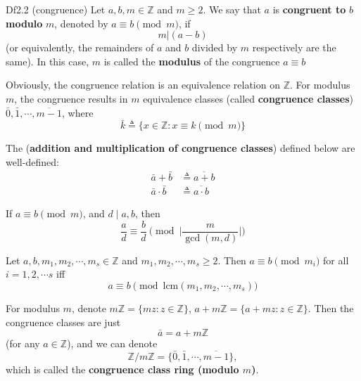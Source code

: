 \documentclass{article}
\newcommand{\lcm}{\text{lcm}}
\begin{document}
\begin{Df}{Df2.2 (congruence)}
    Let $a, b, m\in\mathbb{Z}$ and $m\geq 2$. We say that $a$ is \textbf{congruent to} $b$ \textbf{modulo} $m$, denoted by $a\equiv b\pmod{m}$, if
    $$ m|(a-b) $$
    (or equivalently, the remainders of $a$ and $b$ divided by $m$ respectively are the same). In this case, $m$ is called the \textbf{modulus} of the congruence $a\equiv b$
\end{Df}

\begin{Rmk}{}
    \begin{compactenum}
        \item \textcolor{Th}{Obviously, the congruence relation is an equivalence relation on $\mathbb{Z}$. For modulus $m$, the congruence results in $m$ equivalence classes} \textcolor{Df}{(called \textbf{congruence classes})} \textcolor{Th}{$\bar{0}, \bar{1}, \cdots, \overline{m-1}$, where}
        \textcolor{Df}{$$ \bar{k} \triangleq \{x\in\mathbb{Z}: x\equiv k\pmod{m}\} $$}
        \item \textcolor{Th}{The} \textcolor{Df}{(\textbf{addition and multiplication of congruence classes})} defined below are well-defined:
        \textcolor{Th}{$$ \begin{aligned}
            \bar{a} + \bar{b} &\triangleq \overline{a+b} \\
            \bar{a}\cdot \bar{b} &\triangleq \overline{a\cdot b}
        \end{aligned} $$}
        \item If $a\equiv b\pmod{m}$, and $d\mid a, b$, then
        $$ \frac{a}{d} \equiv \frac{b}{d}\pmod{\Bigg|\frac{m}{\gcd(m, d)}\Bigg|} $$
        \item Let $a, b, m_1, m_2,\cdots, m_s\in\mathbb{Z}$ and $m_1, m_2,\cdots, m_s\geq 2$. Then $a\equiv b\pmod{m_i}$ for all $i = 1, 2,\cdots s$ iff 
        $$ a\equiv b\pmod{\lcm(m_1, m_2,\cdots, m_s)} $$
        \item \textcolor{Df}{For modulus $m$, denote $m\mathbb{Z} = \{mz: z\in\mathbb{Z}\}$, $a + m\mathbb{Z} = \{a+mz: z\in\mathbb{Z}\}$.} \textcolor{Th}{Then the congruence classes are just
        $$ \bar{a} = a + m\mathbb{Z} $$
        (for any $a\in\mathbb{Z}$),} \textcolor{Df}{and we can denote
        $$ \mathbb{Z}/m\mathbb{Z} = \{\bar{0}, \bar{1}, \cdots, \overline{m-1}\}, $$
        which is called the \textbf{congruence class ring (modulo $m$)}.}
    \end{compactenum}
\end{Rmk}
\end{document}
